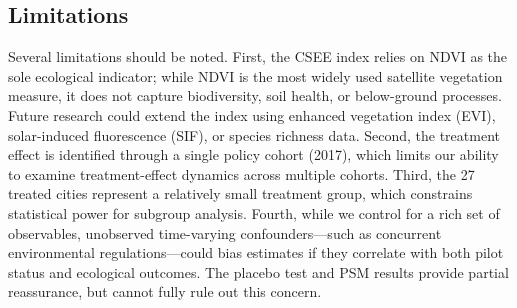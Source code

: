 \subsection{Limitations}

Several limitations should be noted. First, the CSEE index relies on
NDVI as the sole ecological indicator; while NDVI is the most widely
used satellite vegetation measure, it does not capture biodiversity,
soil health, or below-ground processes. Future research could extend
the index using enhanced vegetation index (EVI), solar-induced
fluorescence (SIF), or species richness data. Second, the treatment
effect is identified through a single policy cohort (2017), which
limits our ability to examine treatment-effect dynamics across
multiple cohorts. Third, the 27 treated cities represent a relatively
small treatment group, which constrains statistical power for
subgroup analysis. Fourth, while we control for a rich set of
observables, unobserved time-varying confounders---such as concurrent
environmental regulations---could bias estimates if they correlate
with both pilot status and ecological outcomes. The placebo test
and PSM results provide partial reassurance, but cannot fully rule
out this concern.
